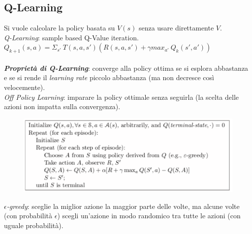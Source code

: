 \documentclass[a4paper, notitlepage, 9pt]{extreport}
\begin{document}
\subsection*{Q-Learning}
Si vuole calcolare la policy basata su $V(s)$ senza usare direttamente $V$.\\
\textit{Q-Learning}: sample based Q-Value iteration.\\
$Q_{k+1}(s, a) = \Sigma_{s'} ~T(s, a, s')(R(s, a, s') + \gamma max_{a'} ~Q_k(s', a'))$\\\\
\textit{\textbf{Proprietà di Q-Learning}}: converge alla policy ottima se si esplora abbastanza e se si rende il \textit{learning rate} piccolo abbastanza (ma non decresce così velocemente).\\
\textit{Off Policy Learning}: imparare la policy ottimale senza seguirla (la scelta delle azioni non impatta sulla convergenza).
\begin{multicols}{2}
	\begin{figure}[H]
		\centering
		\includegraphics[scale=0.32]{QL}
	\end{figure}
	\columnbreak
	\noindent
	$\epsilon$\textit{-greedy}: sceglie la miglior azione la maggior parte delle volte, ma alcune volte (con probabilità $\epsilon$) scegli un'azione in modo randomico tra tutte le azioni (con uguale probabilità).
\end{multicols}
\end{document}
